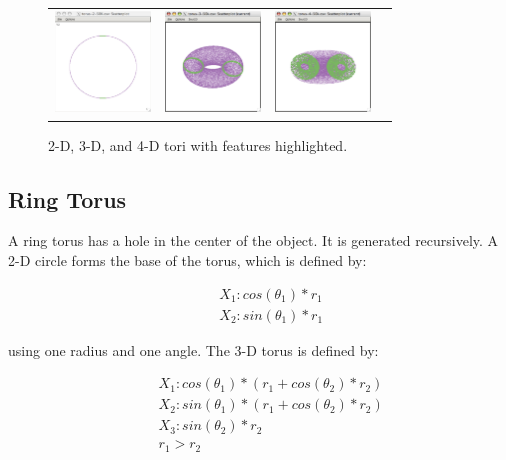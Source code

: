 \begin{figure}[ht]
\centering
\begin{tabular}{c c c c}
\includegraphics[width=1in]{fig/torus-2-50k.pdf} & \includegraphics[width=1in]{fig/torus-3-50k.pdf} & \includegraphics[width=1in]{fig/torus-4-50k.pdf}
\end{tabular}
\caption{2-D, 3-D, and 4-D tori with features highlighted.}
\end{figure}

\subsection{Ring Torus}

A ring torus has a hole in the center of the object. It is generated
recursively. A 2-D circle forms the base of the torus, which is defined by:

\begin{eqnarray*}
&&X_1: cos(\theta_1) * r_1\\
&&X_2: sin(\theta_1) * r_1
\end{eqnarray*}

\noindent using one radius and one angle. The 3-D torus is defined by:

\begin{eqnarray*}
&&X_1: cos(\theta_1) * (r_1 + cos(\theta_2) * r_2)\\
&&X_2: sin(\theta_1) * (r_1 + cos(\theta_2) * r_2)\\
&&X_3: sin(\theta_2) * r_2\\
&&r_1 > r_2
\end{eqnarray*}

